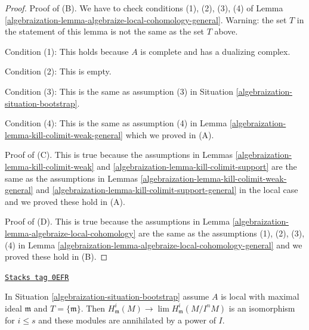 \begin{proof}
\medskip\noindent
Proof of (B). We have to check conditions (1), (2), (3), (4) of
Lemma \ref{algebraization-lemma-algebraize-local-cohomology-general}. Warning:
the set $T$ in the statement of
this lemma is not the same as the set $T$ above.

\medskip\noindent
Condition (1): This holds because $A$ is complete and has a dualizing complex.

\medskip\noindent
Condition (2): This is empty.

\medskip\noindent
Condition (3): This is the same as assumption (3) in
Situation \ref{algebraization-situation-bootstrap}.

\medskip\noindent
Condition (4): This is the same as assumption (4) in
Lemma \ref{algebraization-lemma-kill-colimit-weak-general} which we proved in (A).

\medskip\noindent
Proof of (C). This is true because the assumptions in
Lemmas \ref{algebraization-lemma-kill-colimit-weak} and \ref{algebraization-lemma-kill-colimit-support}
are the same as the assumptions in
Lemmas \ref{algebraization-lemma-kill-colimit-weak-general} and
\ref{algebraization-lemma-kill-colimit-support-general} in the local case
and we proved these hold in (A).

\medskip\noindent
Proof of (D). This is true because the assumptions in
Lemma \ref{algebraization-lemma-algebraize-local-cohomology}
are the same as the assumptions (1), (2), (3), (4) in
Lemma \ref{algebraization-lemma-algebraize-local-cohomology-general}
and we proved these hold in (B).
\end{proof}

\begin{lemma}
\label{algebraization-lemma-algebraize-local-cohomology-bis}
\href{https://stacks.math.columbia.edu/tag/0EFR}{\texttt{Stacks tag 0EFR}}

In Situation \ref{algebraization-situation-bootstrap} assume $A$ is local with
maximal ideal $\mathfrak m$ and $T = \{\mathfrak m\}$. Then
$H^i_\mathfrak m(M) \to \lim H^i_\mathfrak m(M/I^nM)$
is an isomorphism for $i \leq s$ and these modules are
annihilated by a power of $I$.
\end{lemma}

